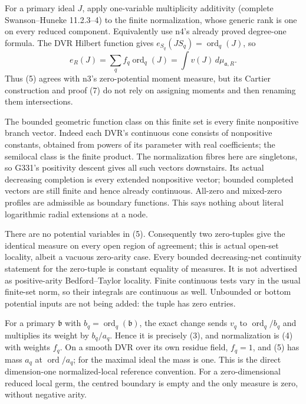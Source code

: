 \documentclass[
  11pt,
]{article}
\begin{document}
For a primary ideal \(J\), apply one-variable multiplicity additivity
(complete Swanson--Huneke 11.2.3--4) to the finite normalization, whose
generic rank is one on every reduced component. Equivalently use n4's
already proved degree-one formula. The DVR Hilbert function gives
\(e_{S_q}(JS_q)=\operatorname{ord}_q(J)\), so
\[e_R(J)=\sum_q f_q\operatorname{ord}_q(J)=\int v(J)\,d\mu_{\mathfrak a,R}.\]
Thus (5) agrees with n3's zero-potential moment measure, but its Cartier
construction and proof (7) do not rely on assigning moments and then
renaming them intersections.

The bounded geometric function class on this finite set is every finite
nonpositive branch vector. Indeed each DVR's continuous cone consists of
nonpositive constants, obtained from powers of its parameter with real
coefficients; the semilocal class is the finite product. The
normalization fibres here are singletons, so G331's positivity descent
gives all such vectors downstairs. Its actual decreasing completion is
every extended nonpositive vector; bounded completed vectors are still
finite and hence already continuous. All-zero and mixed-zero profiles
are admissible as boundary functions. This says nothing about literal
logarithmic radial extensions at a node.

There are no potential variables in (5). Consequently two zero-tuples
give the identical measure on every open region of agreement; this is
actual open-set locality, albeit a vacuous zero-arity case. Every
bounded decreasing-net continuity statement for the zero-tuple is
constant equality of measures. It is not advertised as positive-arity
Bedford--Taylor locality. Finite continuous tests vary in the usual
finite-set norm, so their integrals are continuous as well. Unbounded or
bottom potential inputs are not being added: the tuple has zero entries.

For a primary \(\mathfrak b\) with
\(b_q=\operatorname{ord}_q(\mathfrak b)\), the exact change sends
\(v_q\) to \(\operatorname{ord}_q/b_q\) and multiplies its weight by
\(b_q/a_q\). Hence it is precisely (3), and normalization is (4) with
weights \(f_q\). On a smooth DVR over its own residue field, \(f_q=1\),
and (5) has mass \(a_q\) at \(\operatorname{ord}/a_q\); for the maximal
ideal the mass is one. This is the direct dimension-one normalized-local
reference convention. For a zero-dimensional reduced local germ, the
centred boundary is empty and the only measure is zero, without negative
arity.
\end{document}
